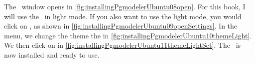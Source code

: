 The \pgmodeler\ window opens in \cref{fig:installingPgmodelerUbuntu08open}.
For this book, I will use the \pgmodeler\ in light mode.
If you also want to use the light mode, you would click on , as shown in \cref{fig:installingPgmodelerUbuntu09openSettings}.
In the  menu, we change the theme the  in \cref{fig:installingPgmodelerUbuntu10themeLight}.
We then click on  in \cref{fig:installingPgmodelerUbuntu11themeLightSet}.
The \pgmodeler\ is now installed and ready to use.%
\FloatBarrier%
\endhsection%
%
